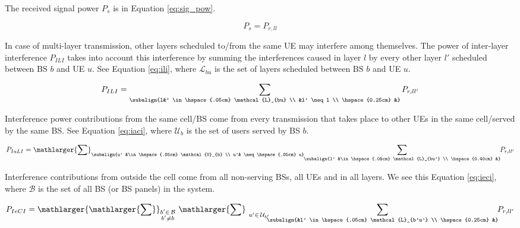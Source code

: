 The received signal power $P_s$ is in Equation \eqref{eq:sig_pow}.

\begin{equation} \label{eq:sig_pow}
    P_s = P_{r, ll} 
\end{equation}


In case of multi-layer transmission, other layers scheduled to/from the same UE may interfere among themselves. The power of inter-layer interference $P_{ILI}$ takes into account this interference by summing the interferences caused in layer $l$ by every other layer $l'$ scheduled between BS $b$ and UE $u$. See Equation \eqref{eq:ili}, where $\mathcal{L}_{bu}$ is the set of layers scheduled between BS $b$ and UE $u$.

\begin{equation} \label{eq:ili}
    P_{ILI} = \sum_{\subalign{l&' \in \hspace{.05cm} \mathcal{L}_{bu} \\ &l' \neq l \\ \hspace{0.25cm} &}} P_{r, ll'} 
\end{equation}


Interference power contributions from the same cell/BS come from every transmission that takes place to other UEs in the same cell/served by the same BS. See Equation \eqref{eq:iaci}, where $\mathcal{U}_{b}$ is the set of users served by BS $b$.

\begin{equation} \label{eq:iaci}
    P_{IaLI} = \mathlarger{\sum}_{\subalign{u' &\in \hspace{.05cm} \mathcal{U}_{b} \\ u'& \neq \hspace{.05cm} u}} \hspace{-0.1cm} \sum_{\subalign{l' &\in \hspace{.05cm} \mathcal{L}_{bu'} \\ \hspace{0.40cm} &}} \hspace{-0.1cm} P_{r, ll'} 
\end{equation}

Interference contributions from outside the cell come from all non-serving BSs, all UEs and in all layers. We see this Equation \eqref{eq:ieci}, where $\mathcal{B}$ is the set of all BS (or BS panels) in the system.

\begin{equation} \label{eq:ieci}
    P_{IeCI} = \mathlarger{\mathlarger{\sum}}_{\substack{b' \in \hspace{.05cm} \mathcal{B} \\ b' \neq b}} \ \mathlarger{\sum}_{\ u' \in \hspace{.05cm} \mathcal{U}_{b'}} \hspace{-0.2cm} \sum_{\subalign{&l' \in \hspace{.05cm} \mathcal{L}_{b'u'} \\ \hspace{0.25cm} &}} \hspace{-0.1cm} P_{r, ll'} 
\end{equation}

